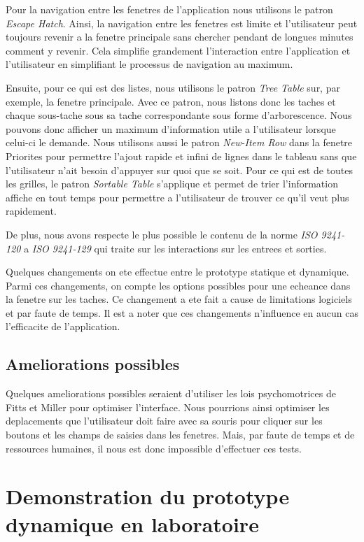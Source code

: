 \documentclass[letterpaper, oneside, 12pt, these, creativecommons]{thETS}
\begin{document}
Pour la navigation entre les fenetres de l'application nous utilisons le patron \emph{Escape Hatch}. Ainsi, la navigation entre les fenetres est limite et l'utilisateur peut toujours revenir a la fenetre principale sans chercher pendant de longues minutes comment y revenir. Cela simplifie grandement l'interaction entre l'application et l'utilisateur en simplifiant le processus de navigation au maximum. 

Ensuite, pour ce qui est des listes, nous utilisons le patron \emph{Tree Table} sur, par exemple, la fenetre principale. Avec ce patron, nous listons donc les taches et chaque sous-tache sous sa tache correspondante sous forme d'arborescence. Nous pouvons donc afficher un maximum d'information utile a l'utilisateur lorsque celui-ci le demande. Nous utilisons aussi le patron \emph{New-Item Row} dans la fenetre Priorites pour permettre l'ajout rapide et infini de lignes dans le tableau sans que l'utilisateur n'ait besoin d'appuyer sur quoi que se soit. Pour ce qui est de toutes les grilles, le patron \emph{Sortable Table} s'applique et permet de trier l'information affiche en tout temps pour permettre a l'utilisateur de trouver ce qu'il veut plus rapidement. 

De plus, nous avons respecte le plus possible le contenu de la norme \emph{ISO 9241-120} a \emph{ISO 9241-129} qui traite sur les interactions sur les entrees et sorties.

Quelques changements on ete effectue entre le prototype statique et dynamique. Parmi ces changements, on compte les options possibles pour une echeance dans la fenetre sur les taches. Ce changement a ete fait a cause de limitations logiciels et par faute de temps. Il est a noter que ces changements n'influence en aucun cas l'efficacite de l'application.

\section{Ameliorations possibles}

Quelques ameliorations possibles seraient d'utiliser les lois psychomotrices de Fitts et Miller pour optimiser l'interface. Nous pourrions ainsi optimiser les deplacements que l'utilisateur doit faire avec sa souris pour cliquer sur les boutons et les champs de saisies dans les fenetres. Mais, par faute de temps et de ressources humaines, il nous est donc impossible d'effectuer ces tests.

\chapter{Demonstration du prototype dynamique en laboratoire}
\end{document}
